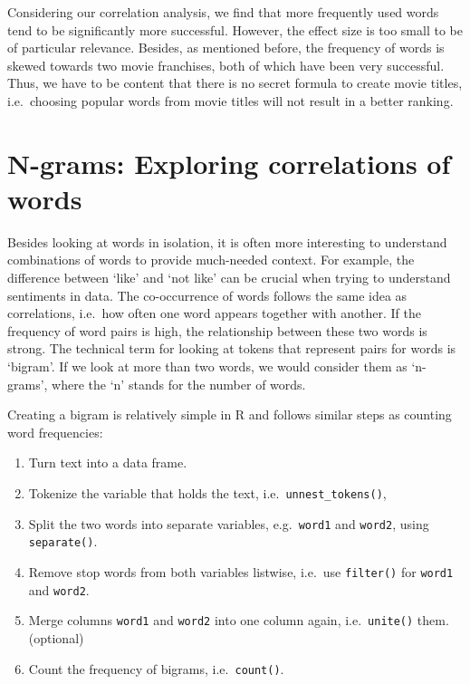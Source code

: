 \documentclass[
]{book}
\providecommand{\tightlist}{%
  \setlength{\itemsep}{0pt}\setlength{\parskip}{0pt}}
\begin{document}
Considering our correlation analysis, we find that more frequently used words tend to be significantly more successful. However, the effect size is too small to be of particular relevance. Besides, as mentioned before, the frequency of words is skewed towards two movie franchises, both of which have been very successful. Thus, we have to be content that there is no secret formula to create movie titles, i.e.~choosing popular words from movie titles will not result in a better ranking.

\hypertarget{n-grams}{%
\section{N-grams: Exploring correlations of words}\label{n-grams}}

Besides looking at words in isolation, it is often more interesting to understand combinations of words to provide much-needed context. For example, the difference between `like' and `not like' can be crucial when trying to understand sentiments in data. The co-occurrence of words follows the same idea as correlations, i.e.~how often one word appears together with another. If the frequency of word pairs is high, the relationship between these two words is strong. The technical term for looking at tokens that represent pairs for words is `bigram'. If we look at more than two words, we would consider them as `n-grams', where the `n' stands for the number of words.

Creating a bigram is relatively simple in R and follows similar steps as counting word frequencies:

\begin{enumerate}
\def\labelenumi{\arabic{enumi}.}
\tightlist
\item
  Turn text into a data frame.
\item
  Tokenize the variable that holds the text, i.e.~\texttt{unnest\_tokens()},
\item
  Split the two words into separate variables, e.g.~\texttt{word1} and \texttt{word2}, using \texttt{separate()}.
\item
  Remove stop words from both variables listwise, i.e.~use \texttt{filter()} for \texttt{word1} and \texttt{word2}.
\item
  Merge columns \texttt{word1} and \texttt{word2} into one column again, i.e.~\texttt{unite()} them. (optional)
\item
  Count the frequency of bigrams, i.e.~\texttt{count()}.
\end{enumerate}
\end{document}
